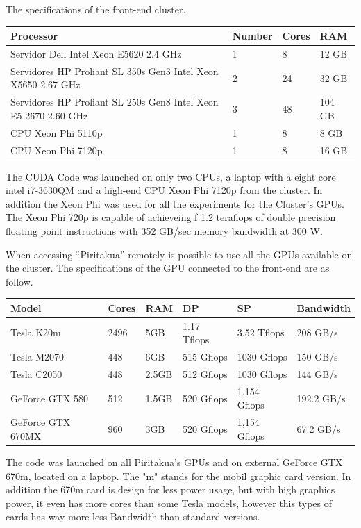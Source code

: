 The specifications of the front-end cluster.

\begin{tabular}{ | p{7.1cm}  | l | l | l |}
  \hline
  Processor & Number & Cores & RAM  \\
  \hline
  Servidor Dell Intel Xeon E5620 2.4 GHz & 1 & 8 & 12 GB \\
  \hline
  Servidores HP Proliant SL 350s Gen3 Intel Xeon X5650 2.67 GHz & 2 & 24 & 32 GB \\
  \hline
   Servidores HP Proliant SL 250s Gen8 Intel Xeon E5-2670 2.60 GHz & 3 & 48 &104 GB \\
   \hline
   CPU Xeon Phi  5110p & 1 & 8 & 8 GB\\
   \hline
   CPU Xeon Phi 7120p  & 1 & 8 & 16 GB\\
   \hline
  \end{tabular}


 The CUDA Code was launched on only two CPUs, a laptop with a eight core intel i7-3630QM and a high-end CPU Xeon Phi 7120p from the cluster. In addition the Xeon Phi was used for all the experiments for the Cluster's GPUs. The Xeon Phi 720p is capable of achieveing f 1.2 teraflops of double precision floating point instructions with 352 GB/sec memory bandwidth at 300 W.

When accessing ``Piritakua'' remotely is possible to use all the GPUs available on the cluster.
 The specifications of the GPU connected to the front-end are as follow.

  \begin{tabular}{ |  l  |  l  |  l  |  l  |  l  | l | }
    \hline
    Model & Cores & RAM & DP & SP & Bandwidth \\
    \hline
    Tesla K20m & 2496 & 5GB & 1.17 Tflops & 3.52 Tflops & 208 GB/s \\
   \hline
    Tesla M2070 & 448 & 6GB & 515 Gflops & 1030 Gflops & 150 GB/s \\
   \hline
     Tesla C2050 & 448 & 2.5GB & 512 Gflops & 1030 Gflops & 144 GB/s \\
   \hline
      GeForce GTX 580 & 512 & 1.5GB & 520 Gflops & 1,154 Gflops & 192.2 GB/s \\
   \hline
   GeForce GTX 670MX & 960 & 3GB & 520 Gflops & 1,154 Gflops & 67.2 GB/s \\
   \hline
  \end{tabular}

   The code was launched on all Piritakua's GPUs and on external GeForce GTX 670m, located on a laptop. The "m" stands for the mobil graphic card version. In addition the 670m card is design for less power usage, but with high graphics power, it even has more cores than some Tesla models, however this types of cards has way more less Bandwidth than standard versions.

